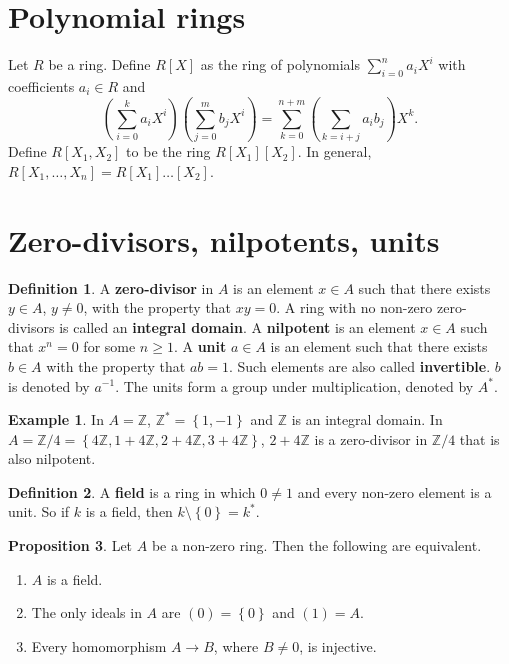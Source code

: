 \documentclass{article}
\newcommand{\Z}{\mathbb{Z}}
\newcommand{\rb}[1]{\left( #1 \right)}
\renewcommand{\sb}[1]{\left[ #1 \right]}
\newcommand{\cb}[1]{\left\{ #1 \right\}}
\theoremstyle{definition}\newtheorem{definition}{Definition}[section]
\theoremstyle{definition}\newtheorem{remark}[definition]{Remark}
\theoremstyle{definition}\newtheorem*{example}{Example}
\theoremstyle{definition}\newtheorem*{note}{Note}
\newtheorem{proposition}[definition]{Proposition}
\begin{document}
\section{Polynomial rings}

Let $ R $ be a ring. Define $ R\sb{X} $ as the ring of polynomials $ \sum_{i = 0}^n a_iX^i $ with coefficients $ a_i \in R $ and
$$ \rb{\sum_{i = 0}^k a_iX^i}\rb{\sum_{j = 0}^m b_jX^i} = \sum_{k = 0}^{n + m} \rb{\sum_{k = i + j} a_ib_j}X^k. $$
Define $ R\sb{X_1, X_2} $ to be the ring $ R\sb{X_1}\sb{X_2} $. In general, $ R\sb{X_1, \dots, X_n} = R\sb{X_1} \dots \sb{X_2} $.

\section{Zero-divisors, nilpotents, units}

\begin{definition}
A \textbf{zero-divisor} in $ A $ is an element $ x \in A $ such that there exists $ y \in A $, $ y \ne 0 $, with the property that $ xy = 0 $. A ring with no non-zero zero-divisors is called an \textbf{integral domain}. A \textbf{nilpotent} is an element $ x \in A $ such that $ x^n = 0 $ for some $ n \ge 1 $. A \textbf{unit} $ a \in A $ is an element such that there exists $ b \in A $ with the property that $ ab = 1 $. Such elements are also called \textbf{invertible}. $ b $ is denoted by $ a^{-1} $. The units form a group under multiplication, denoted by $ A^* $.
\end{definition}

\begin{example}
In $ A = \Z $, $ \Z^* = \cb{1, -1} $ and $ \Z $ is an integral domain. In $ A = \Z / 4 = \cb{4\Z, 1 + 4\Z, 2 + 4\Z, 3 + 4\Z} $, $ 2 + 4\Z $ is a zero-divisor in $ \Z / 4 $ that is also nilpotent.
\end{example}


\begin{definition}
A \textbf{field} is a ring in which $ 0 \ne 1 $ and every non-zero element is a unit. So if $ k $ is a field, then $ k \setminus \cb{0} = k^* $.
\end{definition}

\begin{proposition}
Let $ A $ be a non-zero ring. Then the following are equivalent.
\begin{enumerate}
\item $ A $ is a field.
\item The only ideals in $ A $ are $ \rb{0} = \cb{0} $ and $ \rb{1} = A $.
\item Every homomorphism $ A \to B $, where $ B \ne 0 $, is injective.
\end{enumerate}
\end{proposition}
\end{document}
